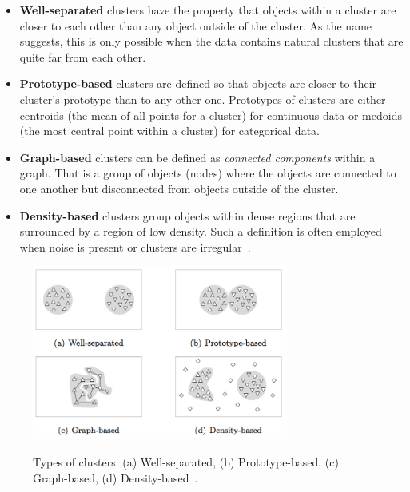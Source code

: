\begin{itemize}

\item \textbf{Well-separated} clusters have the property that objects within a cluster are closer to each other than any object outside of the cluster. As the name suggests, this is only possible when the data contains natural clusters that are quite far from each other.

\item \textbf{Prototype-based} clusters are defined so that objects are closer to their cluster's prototype than to any other one. Prototypes of clusters are either centroids (the mean of all points for a cluster) for continuous data or medoids (the most central point within a cluster) for categorical data.

\item \textbf{Graph-based} clusters can be defined as \emph{connected components} within a graph. That is a group of objects (nodes) where the objects are connected to one another but disconnected from objects outside of the cluster.

\item \textbf{Density-based} clusters group objects within dense regions that are surrounded by a region of low density. Such a definition is often employed when noise is present or clusters are irregular~\cite{Meert06clustermaps}.

\end{itemize}

\begin{figure}[h]
  \begin{center}
    \includegraphics[width=0.75\textwidth]{figures/cluster_types.png}
    \label{fig:clusters}
    \caption{Types of clusters: (a) Well-separated, (b) Prototype-based, (c) Graph-based, (d) Density-based~\cite[p 9]{Meert06clustermaps}.}
  \end{center}
\end{figure}



